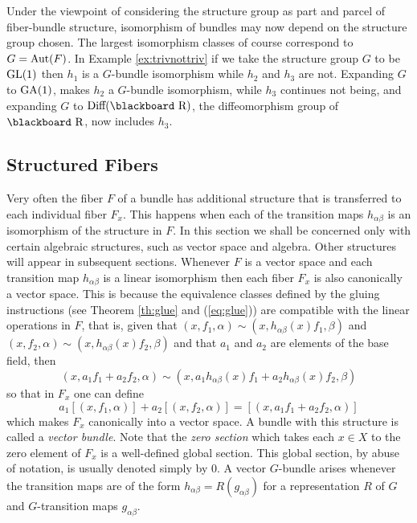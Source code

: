 \documentclass[12pt,titlepage]{article}
\def\bbf#1{\hbox{\blackboard #1}}
\def\lR{\bbf R}
\def\Aut{\hbox{Aut}}
\def\GA{\hbox{GA}}
\def\GL{\hbox{GL}}
\begin{document}
Under the viewpoint of considering the structure group as part and
parcel of fiber-bundle structure,
isomorphism of bundles may now depend on the
structure group chosen. The largest isomorphism classes of course
correspond to \(G=\Aut(F)\). In Example \ref{ex:trivnottriv} if we take the
structure group  \(G\) to be \(\GL(1)\) then \(h_1\) is a \(G\)-bundle
isomorphism while \(h_2\) and \(h_3\) are not. Expanding \(G\) to 
\(\GA(1)\),  makes \(h_2\) a \(G\)-bundle
isomorphism, while \(h_3\) continues not being, and expanding \(G\) to
\(\hbox{Diff}(\lR)\), the diffeomorphism group of \(\lR\), 
 now includes \(h_3\). 




\subsection{Structured  Fibers}
Very often the fiber \(F\) of a bundle has additional structure that is
transferred to each individual fiber \(F_x\). This
happens when each of the transition maps \(h_{\alpha\beta}\) is an
isomorphism of the structure in \(F\). In this section  we shall be
concerned only with certain algebraic structures, such as
 vector space and algebra. Other structures will appear in subsequent
sections. Whenever \(F\) is a vector space and each transition map
\(h_{\alpha\beta}\) is a linear isomorphism then each fiber \(F_x\) is
also canonically a vector space. This is because the equivalence classes
defined by the gluing instructions (see Theorem \ref{th:glue} and 
(\ref{eq:glue})) are
compatible with the linear operations in \(F\),
that is, given that
\((x,f_1,\alpha) \sim (x, h_{\alpha\beta}(x)f_1,\beta)\) and
\((x,f_2,\alpha) \sim (x ,h_{\alpha\beta}(x)f_2,\beta)\) and that \(a_1\)
and \(a_2\) are elements of the base field, then
\[
(x,a_1f_1+a_2f_2,\alpha) \sim (x,
a_1h_{\alpha\beta}(x)f_1+a_2h_{\alpha\beta}(x)f_2,\beta)
\]
so that in \(F_x \) one can
define
\[
a_1[(x,f_1,\alpha)]+a_2[(x,f_2,\alpha)]=[(x,
a_1f_1+a_2f_2,\alpha)]
\]
which makes \(F_x \) canonically into a vector
space. A bundle with this structure is called a {\em vector
bundle\/}. 
%
Note that the {\em zero section\/}
%
 which takes each \(x\in
X\) to the zero element of \(F_x\) is a well-defined global section.
This global section, by abuse of notation, is usually denoted simply by
\(0\). A vector \(G\)-bundle arises whenever the transition maps are of
the form \(h_{\alpha\beta} = R(g_{\alpha\beta})\) for a representation
\(R\) of \(G\) and \(G\)-transition maps \(g_{\alpha\beta}\).
\end{document}
